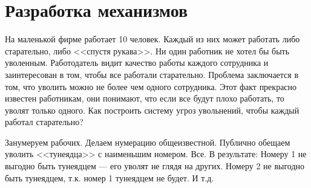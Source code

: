 \section{Разработка механизмов}

\begin{problem}\par
\begin{source} \cite{miller:gtw} \end{source}
На маленькой фирме работает 10 человек. Каждый из них может работать либо старательно, либо <<спустя рукава>>. Ни один работник не хотел бы быть уволенным. Работодатель видит качество работы каждого сотрудника и заинтересован в том, чтобы все работали старательно. Проблема заключается в том, что уволить можно не более чем одного сотрудника. Этот факт прекрасно известен работникам, они понимают, что если все будут плохо работать, то уволят только одного. Как построить систему угроз увольнений, чтобы каждый работал старательно?\par




\begin{sol}
Занумеруем рабочих. Делаем нумерацию общеизвестной. Публично обещаем уволить <<тунеядца>> с наименьшим номером. Все. В результате: Номеру 1 не выгодно быть тунеядцем --- его уволят не глядя на других. Номеру 2 не выгодно быть тунеядцем, т.к. номер 1 тунеядцем не будет. И т.д.
\end{sol}
\end{problem}



